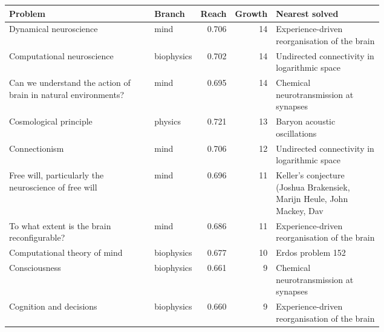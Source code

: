 \begin{tabular}{@{}p{0.42\linewidth}lrrp{0.3\linewidth}@{}}
\toprule
Problem & Branch & Reach & Growth & Nearest solved \\
\midrule
Dynamical neuroscience & mind & 0.706 & 14 & Experience-driven reorganisation of the brain \\
Computational neuroscience & biophysics & 0.702 & 14 & Undirected connectivity in logarithmic space \\
Can we understand the action of brain in natural environments? & mind & 0.695 & 14 & Chemical neurotransmission at synapses \\
Cosmological principle & physics & 0.721 & 13 & Baryon acoustic oscillations \\
Connectionism & mind & 0.706 & 12 & Undirected connectivity in logarithmic space \\
Free will, particularly the neuroscience of free will & mind & 0.696 & 11 & Keller's conjecture (Joshua Brakensiek, Marijn Heule, John Mackey, Dav \\
To what extent is the brain reconfigurable? & mind & 0.686 & 11 & Experience-driven reorganisation of the brain \\
Computational theory of mind & biophysics & 0.677 & 10 & Erdos problem 152 \\
Consciousness & biophysics & 0.661 & 9 & Chemical neurotransmission at synapses \\
Cognition and decisions & biophysics & 0.660 & 9 & Experience-driven reorganisation of the brain \\
\bottomrule
\end{tabular}
